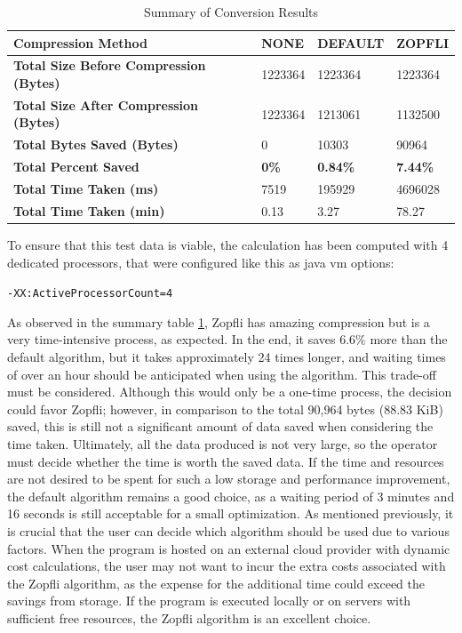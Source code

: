 \begin{table}[H]
    \centering
    \begin{tabular}{|p{7cm}|p{2.1cm}|p{2.1cm}|p{2.1cm}|}
        \hline
        \textbf{Compression Method} & \textbf{NONE} & \textbf{DEFAULT} & \textbf{ZOPFLI} \\ \hline
        \textbf{Total Size Before Compression (Bytes)} & 1223364 & 1223364 & 1223364 \\ \hline
        \textbf{Total Size After Compression (Bytes)} & 1223364 & 1213061 & 1132500 \\ \hline
        \textbf{Total Bytes Saved (Bytes)} & 0 & 10303 & 90964 \\ \hline
        \textbf{Total Percent Saved} & \textbf{0\%} & \textbf{0.84\%} & \textbf{7.44\%} \\ \hline
        \textbf{Total Time Taken (ms)} & 7519 & 195929 & 4696028 \\ \hline
        \textbf{Total Time Taken (min)} & 0.13 & 3.27 & 78.27 \\ \hline
    \end{tabular}
    \caption{Summary of Conversion Results}
    \label{tab:summary_compression}
\end{table}

To ensure that this test data is viable, the calculation has been computed with 4 dedicated processors, that were configured like this as java vm options:

\texttt{-XX:ActiveProcessorCount=4}

As observed in the summary table \ref{tab:summary_compression}, Zopfli has amazing compression but is a very time-intensive process, as expected. In the end, it saves 6.6\% more than the default algorithm, but it takes approximately 24 times longer, and waiting times of over an hour should be anticipated when using the algorithm. This trade-off must be considered. Although this would only be a one-time process, the decision could favor Zopfli; however, in comparison to the total 90,964 bytes (88.83 KiB) saved, this is still not a significant amount of data saved when considering the time taken. Ultimately, all the data produced is not very large, so the operator must decide whether the time is worth the saved data. If the time and resources are not desired to be spent for such a low storage and performance improvement, the default algorithm remains a good choice, as a waiting period of 3 minutes and 16 seconds is still acceptable for a small optimization. As mentioned previously, it is crucial that the user can decide which algorithm should be used due to various factors. When the program is hosted on an external cloud provider with dynamic cost calculations, the user may not want to incur the extra costs associated with the Zopfli algorithm, as the expense for the additional time could exceed the savings from storage. If the program is executed locally or on servers with sufficient free resources, the Zopfli algorithm is an excellent choice.

